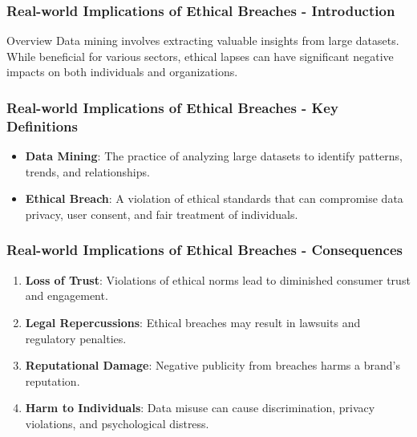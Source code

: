 \documentclass[aspectratio=169]{beamer}
\begin{document}
\begin{frame}[fragile]
    \frametitle{Real-world Implications of Ethical Breaches - Introduction}
    \begin{block}{Overview}
        Data mining involves extracting valuable insights from large datasets. While beneficial for various sectors, ethical lapses can have significant negative impacts on both individuals and organizations.
    \end{block}
\end{frame}

\begin{frame}[fragile]
    \frametitle{Real-world Implications of Ethical Breaches - Key Definitions}
    \begin{itemize}
        \item \textbf{Data Mining}: The practice of analyzing large datasets to identify patterns, trends, and relationships.
        \item \textbf{Ethical Breach}: A violation of ethical standards that can compromise data privacy, user consent, and fair treatment of individuals.
    \end{itemize}
\end{frame}

\begin{frame}[fragile]
    \frametitle{Real-world Implications of Ethical Breaches - Consequences}
    \begin{enumerate}
        \item \textbf{Loss of Trust}: Violations of ethical norms lead to diminished consumer trust and engagement.
        \item \textbf{Legal Repercussions}: Ethical breaches may result in lawsuits and regulatory penalties.
        \item \textbf{Reputational Damage}: Negative publicity from breaches harms a brand's reputation.
        \item \textbf{Harm to Individuals}: Data misuse can cause discrimination, privacy violations, and psychological distress.
    \end{enumerate}
\end{frame}
\end{document}

